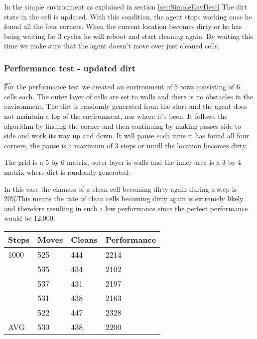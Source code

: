 In the simple environment as explained in section \ref{sec:SimpleEnvDesc} The dirt
 state in the cell is updated. With this condition, the agent stops working once he
 found all the four corners. When the current location becomes dirty or he has being
 waiting for 3 cycles he will reboot and start cleaning again. By waiting this time 
 we make sure that the agent doesn't move over just cleaned cells.

\subsubsection{Performance test - updated dirt}
\t For the performance test we created an environment of 5 rows consisting of 6
cells each.  The outer layer of cells are set to walls and there is no obstacles
in the environment.  The dirt is randomly generated from the start and the agent
does not maintain a log of the environment, nor where it's been. It follows the
algorithm by finding the corner and then continuing by making passes side to
side and work its way up and down.  It will pause each time it has found all
four corners, the pause is a maximum of 3 steps or untill the location becomes
dirty.

The grid is a 5 by 6 matrix, outer layer is walls and the inner area is a 3 by 4
matrix where dirt is randomly generated.

In this case the chances of a clean cell becoming dirty again during a step is
20\%\.  This means the rate of clean cells becoming dirty again is extremely
likely and therefore resulting in such a low performance since the perfect
performance would be 12.000.

\begin{longtable}{ p{} p{} p{} 
									 p{} }
Steps & Moves & Cleans	& Performance \\\hline
1000	& 525 & 444 & 2214 \\
 		 	& 535 & 434 & 2102 \\
 			& 537 & 431 & 2197 \\
 			& 531 & 438 & 2163 \\
 			& 522 & 447 & 2328 \\\hline
AVG		& 530 & 438 &	2200 \\\hline
\end{longtable}




